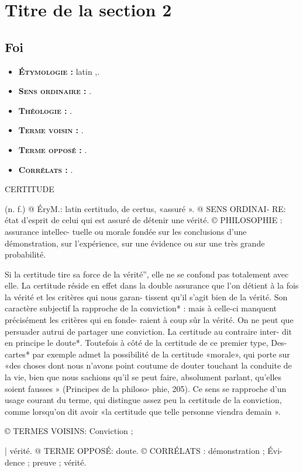 
\section{Titre de la section 2}

 
\subsection{Foi}


\begin{itemize}[leftmargin=1cm, label=, itemsep=1pt]
\item {\bf \textsc{Étymologie} :} latin {\it },.
\item {\bf \textsc{Sens ordinaire} :} .
\item {\bf \textsc{Théologie} :} .
\end{itemize}

\begin{itemize}[leftmargin=1cm, label=, itemsep=1pt]
\item {\bf \textsc{Terme voisin} :} .
\item {\bf \textsc{Terme opposé} :} .
\item {\bf \textsc{Corrélats} :} .
\end{itemize}


CERTITUDE

(n. f.) @ ÉryM.: latin certitudo, de
certus, «assuré ». @ SENS ORDINAI-
RE: état d'esprit de celui qui est
assuré de détenir une vérité.
© PHILOSOPHIE : assurance intellec-
tuelle ou morale fondée sur les
conclusions d’une démonstration,
sur l'expérience, sur une évidence
ou sur une très grande probabilité.

Si la certitude tire sa force de la vérité”,
elle ne se confond pas totalement avec
elle. La certitude réside en effet dans la
double assurance que l’on détient à la fois
la vérité et les critères qui nous garan-
tissent qu'il s’agit bien de la vérité. Son
caractère subjectif la rapproche de la
conviction* : mais à celle-ci manquent
précisément les critères qui en fonde-
raient à coup sûr la vérité. On ne peut
que persuader autrui de partager une
conviction. La certitude au contraire inter-
dit en principe le doute*. Toutefois à côté
de la certitude de ce premier type, Des-
cartes* par exemple admet la possibilité
de la certitude «morale», qui porte sur
«des choses dont nous n'avons point
coutume de douter touchant la conduite
de la vie, bien que nous sachions qu'il se
peut faire, absolument parlant, qu'elles
soient fausses » (Principes de la philoso-
phie, 205). Ce sens se rapproche d'un
usage courant du terme, qui distingue
assez peu la certitude de la conviction,
comme lorsqu'on dit avoir «la certitude
que telle personne viendra demain ».

© TERMES VOISINS: Conviction ;

| vérité. @ TERME OPPOSÉ: doute.
© CORRÉLATS : démonstration ; Évi-
dence ; preuve ; vérité.

 
